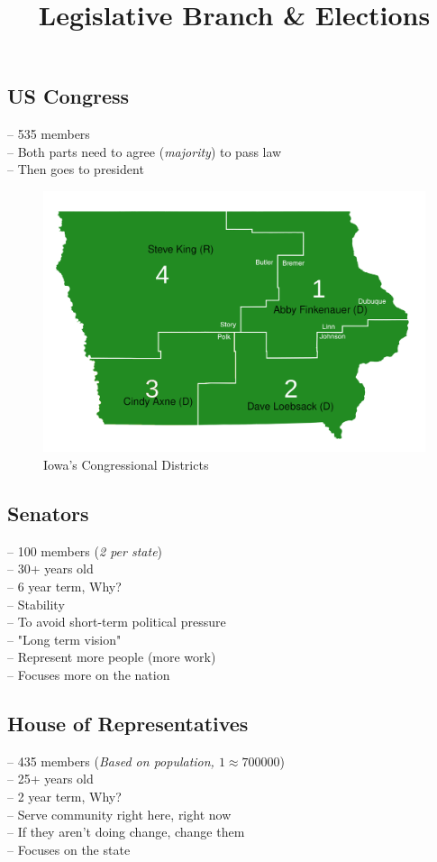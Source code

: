 \documentclass[]{article}
\title{Legislative Branch \& Elections}
\author{}
\date{}
\begin{document}
\maketitle

\subsection*{US Congress}
-- 535 members \\
-- Both parts need to agree (\emph{majority}) to pass law \\
\indent-- Then goes to president

\begin{figure}
	\includegraphics[width=1.1\linewidth]{iowa-districts.png}
	\caption{Iowa's Congressional Districts}
\end{figure}

\subsection*{Senators}
-- 100 members (\emph{2 per state}) \\
-- 30+ years old \\
-- 6 year term, Why? \\
\indent-- Stability \\
\indent-- To avoid short-term political pressure \\
\indent\indent-- "Long term vision" \\
\indent-- Represent more people (more work) \\
\indent-- Focuses more on the nation

\subsection*{House of Representatives}
-- 435 members (\emph{Based on population, $1 \approx 700000$}) \\
-- 25+ years old \\
-- 2 year term, Why? \\
\indent-- Serve community right here, right now \\
\indent-- If they aren't doing change, change them \\
\indent-- Focuses on the state
\end{document}
